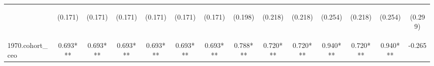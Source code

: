 \begin{center}
\begin{tabular}{lccccccccccccc}
\vspace{4pt} & \begin{footnotesize}(0.171)\end{footnotesize} & \begin{footnotesize}(0.171)\end{footnotesize} & \begin{footnotesize}(0.171)\end{footnotesize} & \begin{footnotesize}(0.171)\end{footnotesize} & \begin{footnotesize}(0.171)\end{footnotesize} & \begin{footnotesize}(0.171)\end{footnotesize} & \begin{footnotesize}(0.198)\end{footnotesize} & \begin{footnotesize}(0.218)\end{footnotesize} & \begin{footnotesize}(0.218)\end{footnotesize} & \begin{footnotesize}(0.254)\end{footnotesize} & \begin{footnotesize}(0.218)\end{footnotesize} & \begin{footnotesize}(0.254)\end{footnotesize} & \begin{footnotesize}(0.299)\end{footnotesize} \\
1970.cohort\_ceo & 0.693*** & 0.693*** & 0.693*** & 0.693*** & 0.693*** & 0.693*** & 0.788*** & 0.720*** & 0.720*** & 0.940*** & 0.720*** & 0.940*** & -0.265 \\

\end{tabular}
\end{center}
